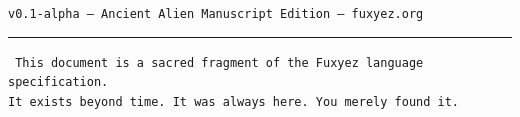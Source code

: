 \documentclass[12pt, a4paper]{book}
\begin{document}
\begin{titlepage}
    \vspace{2cm}
    {\color{sectiongold}\fontsize{9}{11}\selectfont\texttt{v0.1-alpha -- Ancient Alien Manuscript Edition -- fuxyez.org}}
    
    \vspace{1cm}
    {\color{alienPurple}\rule{12cm}{0.6pt}}
    
    \vspace{0.5cm}
    {\color{starWhite}\fontsize{8}{10}\selectfont\texttt{
    This document is a sacred fragment of the Fuxyez language specification.\\
    It exists beyond time. It was always here. You merely found it.
    }}
    
    \end{titlepage}
    
    \pagecolor{cosmicbg}
    \color{starWhite}
    
    \renewcommand{\cfttoctitlefont}{\color{neonCyan}\Large\bfseries}
    \renewcommand{\cftchapfont}{\color{glowGold}\bfseries}
    \renewcommand{\cftchappagefont}{\color{alienPurple}}
    \renewcommand{\cftsecfont}{\color{starWhite}}
    \renewcommand{\cftsubsecfont}{\color{neonCyan}\small}
    
    \tableofcontents
    \clearpage
    
    
\end{document}
